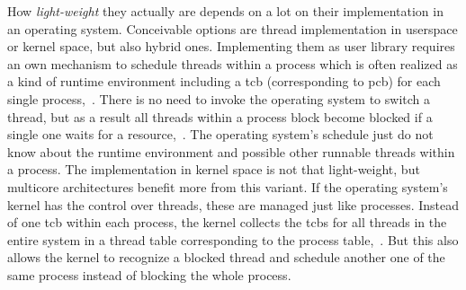 How \textit{light-weight} they actually are depends on a lot on their implementation in an operating system.
Conceivable options are thread implementation in userspace or kernel space, but also hybrid ones. 
Implementing them as user library requires an own mechanism to schedule threads within a process which is often realized as a kind of runtime environment including a \ac{tcb} (corresponding to \ac{pcb}) for each single process\cite{mandl2014Grundkurs},~\cite{tanenbaum-modern-operating-systems}.
There is no need to invoke the operating system to switch a thread, but as a result all threads within a process block become blocked if a single one waits for a resource\cite{tanenbaum-modern-operating-systems},~\cite{brause2017betriebssysteme}. 
The operating system's schedule just do not know about the runtime environment and possible other runnable threads within a process.
The implementation in kernel space is not that light-weight, but multicore architectures benefit more from this variant.
If the operating system's kernel has the control over threads, these are managed just like processes.
Instead of one \ac{tcb} within each process, the kernel collects the \acp{tcb} for all threads in the entire system in a thread table corresponding to the process table\cite{tanenbaum-modern-operating-systems},~\cite{mandl2014Grundkurs}.
But this also allows the kernel to recognize a blocked thread and schedule another one of the same process instead of blocking the whole process\cite{tanenbaum-modern-operating-systems}.


